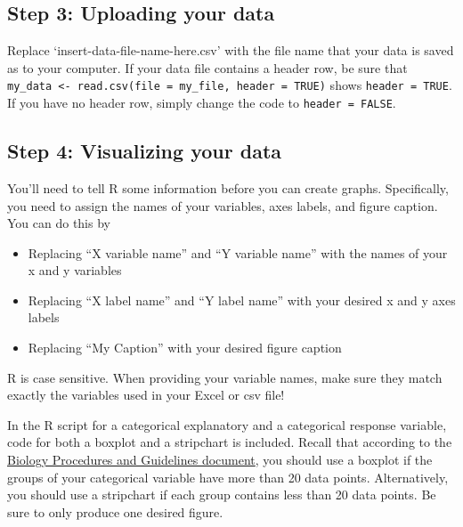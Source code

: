 \documentclass[
]{book}
\providecommand{\tightlist}{%
  \setlength{\itemsep}{0pt}\setlength{\parskip}{0pt}}
\begin{document}
\hypertarget{step-3-uploading-your-data}{%
\subsection*{Step 3: Uploading your data}\label{step-3-uploading-your-data}}

Replace `insert-data-file-name-here.csv' with the file name that your data is saved as to your computer. If your data file contains a header row, be sure that \texttt{my\_data\ \textless{}-\ read.csv(file\ =\ my\_file,\ header\ =\ TRUE)} shows \texttt{header\ =\ TRUE}. If you have no header row, simply change the code to \texttt{header\ =\ FALSE}.

\hypertarget{step-4-visualizing-your-data}{%
\subsection*{Step 4: Visualizing your data}\label{step-4-visualizing-your-data}}

You'll need to tell R some information before you can create graphs. Specifically, you need to assign the names of your variables, axes labels, and figure caption. You can do this by

\begin{itemize}
\tightlist
\item
  Replacing ``X variable name'' and ``Y variable name'' with the names of your x and y variables
\item
  Replacing ``X label name'' and ``Y label name'' with your desired x and y axes labels
\item
  Replacing ``My Caption'' with your desired figure caption
\end{itemize}

R is case sensitive. When providing your variable names, make sure they match exactly the variables used in your Excel or csv file!

In the R script for a categorical explanatory and a categorical response variable, code for both a boxplot and a stripchart is included. Recall that according to the \href{https://ubco-biology.github.io/Procedures-and-Guidelines/figures.html}{Biology Procedures and Guidelines document}, you should use a boxplot if the groups of your categorical variable have more than 20 data points. Alternatively, you should use a stripchart if each group contains less than 20 data points. Be sure to only produce one desired figure.
\end{document}
